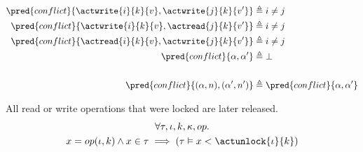 \begin{align*}
\pred{conflict}{\actwrite{i}{k}{v}, \actwrite{j}{k}{v'}} &\triangleq i \neq j
\\
\pred{conflict}{\actwrite{i}{k}{v}, \actread{j}{k}{v'}} &\triangleq i \neq j
\\
\pred{conflict}{\actread{i}{k}{v}, \actwrite{j}{k}{v'}} &\triangleq i \neq j
\\
\pred{conflict}{\alpha, \alpha'} &\triangleq \bot
\\ \\
\pred{conflict}{(\alpha, n), (\alpha', n')} &\triangleq \pred{conflict}{\alpha, \alpha'}
\end{align*}

\lem \label{lem:unlock} All read or write operations that were locked are later released.
\begin{gather*}
\forall \tau, \iota, k, \kappa, op \ldotp \\
x = op(\iota, k) \land x \in \tau \implies \left( \tau \vDash x < \actunlock{\iota}{k} \right)
\end{gather*}

